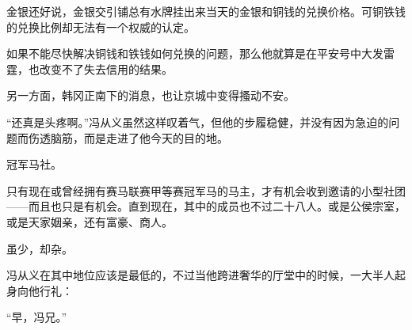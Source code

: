 金银还好说，金银交引铺总有水牌挂出来当天的金银和铜钱的兑换价格。可铜铁钱的兑换比例却无法有一个权威的认定。

如果不能尽快解决铜钱和铁钱如何兑换的问题，那么他就算是在平安号中大发雷霆，也改变不了失去信用的结果。

另一方面，韩冈正南下的消息，也让京城中变得搔动不安。

“还真是头疼啊。”冯从义虽然这样叹着气，但他的步履稳健，并没有因为急迫的问题而伤透脑筋，而是走进了他今天的目的地。

冠军马社。

只有现在或曾经拥有赛马联赛甲等赛冠军马的马主，才有机会收到邀请的小型社团——而且也只是有机会。直到现在，其中的成员也不过二十八人。或是公侯宗室，或是天家姻亲，还有富豪、商人。

虽少，却杂。

冯从义在其中地位应该是最低的，不过当他跨进奢华的厅堂中的时候，一大半人起身向他行礼：

“早，冯兄。”

